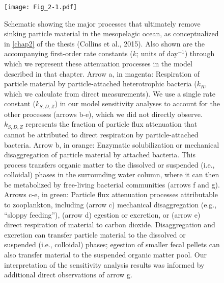 \begin{figure}[!p]
\centering
\texttt{[image: Fig\_2-1.pdf]}
\caption[Schematic showing the major processes that ultimately remove sinking particle material in the mesopelagic ocean, as conceptualized in \autoref{chap2}.]{Schematic showing the major processes that ultimately remove sinking particle material in the mesopelagic ocean, as conceptualized in \autoref{chap2} of the thesis (Collins et al., 2015). Also shown are the accompanying first-order rate constants ($k$; units of day$^{-1}$) through which we represent these attenuation processes in the model described in that chapter. Arrow a, in magenta: Respiration of particle material by particle-attached heterotrophic bacteria ($k_{R}$, which we calculate from direct measurements). We use a single rate constant ($k_{S,D,Z}$) in our model sensitivity analyses to account for the other processes (arrows b-e), which we did not directly observe. $k_{S,D,Z}$ represents the fraction of particle flux attenuation that cannot be attributed to direct respiration by particle-attached bacteria. Arrow b, in orange: Enzymatic solubilization or mechanical disaggregation of particle material by attached bacteria. This process transfers organic matter to the dissolved or suspended (i.e., colloidal) phases in the surrounding water column, where it can then be metabolized by free-living bacterial communities (arrows f and g). Arrows c-e, in green: Particle flux attenuation processes attributable to zooplankton, including (arrow c) mechanical disaggregation (e.g., ``sloppy feeding''), (arrow d) egestion or excretion, or (arrow e) direct respiration of material to carbon dioxide. Disaggregation and excretion can transfer particle material to the dissolved or suspended (i.e., colloidal) phases; egestion of smaller fecal pellets can also transfer material to the suspended organic matter pool. Our interpretation of the sensitivity analysis results was informed by additional direct observations of arrow g.}
\label{fig:c2n1}
\end{figure}

